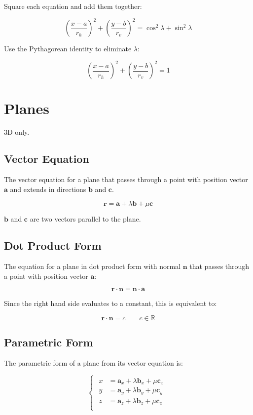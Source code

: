 \documentclass[a4paper,11pt]{report}
\newcommand{\bb}{\boldsymbol}
\begin{document}
Square each equation and add them together:

$$
(\frac{x - a}{r_h})^2 + (\frac{y - b}{r_v})^2 = \cos^2{\lambda} + \sin^2{\lambda}
$$

Use the Pythagorean identity to eliminate $\lambda$:

$$
(\frac{x - a}{r_h})^2 + (\frac{y - b}{r_v})^2 = 1
$$


\section{Planes}

3D only.

\subsection{Vector Equation}

The vector equation for a plane that passes through a point with position
vector $\bb{a}$ and extends in directions $\bb{b}$ and $\bb{c}$.

$$
\bb{r} = \bb{a} + \lambda \bb{b} + \mu \bb{c}
$$

$\bb{b}$ and $\bb{c}$ are two vectors parallel to the plane.

\subsection{Dot Product Form}

The equation for a plane in dot product form with normal $\bb{n}$ that passes
through a point with position vector $\bb{a}$:

$$
\bb{r} \cdot \bb{n} = \bb{n} \cdot \bb{a}
$$

Since the right hand side evaluates to a constant, this is equivalent to:

$$
\bb{r} \cdot \bb{n} = c \qquad c \in \mathbb{R}
$$

\subsection{Parametric Form}

The parametric form of a plane from its vector equation is:

$$
\begin{cases}
\begin{aligned}
x & = \bb{a}_x + \lambda \bb{b}_x + \mu \bb{c}_x \\
y & = \bb{a}_y + \lambda \bb{b}_y + \mu \bb{c}_y \\
z & = \bb{a}_z + \lambda \bb{b}_z + \mu \bb{c}_z \\
\end{aligned}
\end{cases}
$$
\end{document}
